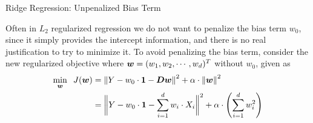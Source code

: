 %
%
%
%
\begin{frame}{Ridge Regression: Unpenalized Bias Term}

    Often in $L_2$ regularized regression we do not want to penalize the
    bias term $w_0$, since it simply provides the intercept
    information, and there is no real justification to try to minimize
    it.
    To avoid penalizing the bias term, consider the new regularized
    objective where ${\boldsymbol w} = (w_1, w_2, \cdots, w_d)^T$ without $w_0$,
    given as
\begin{align}
    \min_{\boldsymbol w}\;\; J({\boldsymbol w}) & = 
    \left\lVert Y - w_0 \cdot \mathbf{1} - {\boldsymbol D}{\boldsymbol w}\right\rVert^2 + \alpha \cdot
    \left\lVert{\boldsymbol w}\right\rVert^2
    \label{eq:reg:linear:l2_unpenalized_bias}\\
    & = \biggl\lVert Y - w_0 \cdot \mathbf{1} - \sum_{i=1}^d w_i \cdot
        X_i \biggr\rVert^2 +
    \alpha \cdot \left( \sum^{d}_{i=1} w_i^2 \right) \notag
\end{align}
%    


\end{frame}
